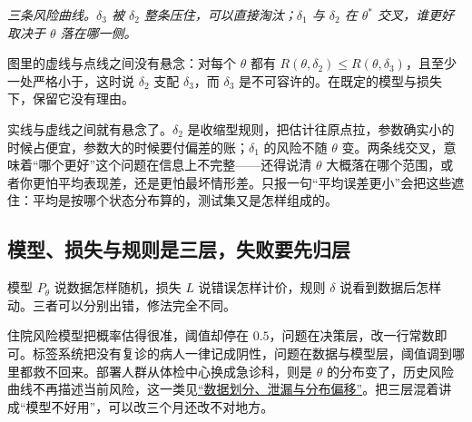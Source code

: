\begin{center}

\emph{三条风险曲线。\(\delta_3\) 被 \(\delta_2\) 整条压住，可以直接淘汰；\(\delta_1\) 与 \(\delta_2\) 在 \(\theta^\ast\) 交叉，谁更好取决于 \(\theta\) 落在哪一侧。}
\end{center}

图里的虚线与点线之间没有悬念：对每个 \(\theta\) 都有 \(R(\theta,\delta_2)\le R(\theta,\delta_3)\)，且至少一处严格小于，这时说 \(\delta_2\) 支配 \(\delta_3\)，而 \(\delta_3\) 是不可容许的。在既定的模型与损失下，保留它没有理由。

实线与虚线之间就有悬念了。\(\delta_2\) 是收缩型规则，把估计往原点拉，参数确实小的时候占便宜，参数大的时候要付偏差的账；\(\delta_1\) 的风险不随 \(\theta\) 变。两条线交叉，意味着``哪个更好''这个问题在信息上不完整——还得说清 \(\theta\) 大概落在哪个范围，或者你更怕平均表现差，还是更怕最坏情形差。只报一句``平均误差更小''会把这些遮住：平均是按哪个状态分布算的，测试集又是怎样组成的。

\subsection{模型、损失与规则是三层，失败要先归层}

模型 \(P_\theta\) 说数据怎样随机，损失 \(L\) 说错误怎样计价，规则 \(\delta\) 说看到数据后怎样动。三者可以分别出错，修法完全不同。

住院风险模型把概率估得很准，阈值却停在 \(0.5\)，问题在决策层，改一行常数即可。标签系统把没有复诊的病人一律记成阴性，问题在数据与模型层，阈值调到哪里都救不回来。部署人群从体检中心换成急诊科，则是 \(\theta\) 的分布变了，历史风险曲线不再描述当前风险，这一类见\hyperref[sec:13-Machine-Learning/01-Learning-Problems-and-Evaluation/04]{``数据划分、泄漏与分布偏移''}。把三层混着讲成``模型不好用''，可以改三个月还改不对地方。

